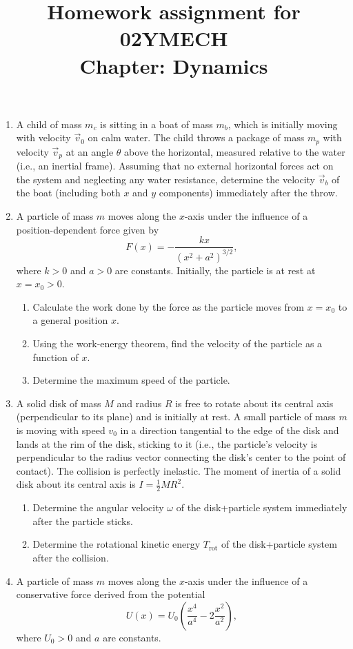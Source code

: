 \documentclass[12pt]{article}
\title{Homework assignment for 02YMECH \\ Chapter: Dynamics}
\begin{document}
\date{}
\maketitle
\vspace{-0.8in}
\begin{enumerate}
    \item A child of mass $m_c$ is sitting in a boat of mass $m_b$, which is initially moving with velocity $\vec{v}_0$ on calm water. The child throws a package of mass $m_p$ with velocity $\vec{v}_p$ at an angle $\theta$ above the horizontal, measured relative to the water (i.e., an inertial frame). Assuming that no external horizontal forces act on the system and neglecting any water resistance, determine the velocity $\vec{v}_b$ of the boat (including both $x$ and $y$ components) immediately after the throw.
    \item A particle of mass $m$ moves along the $x$-axis under the influence of a position-dependent force given by
\[
F(x) = - \frac{k x}{(x^2 + a^2)^{3/2}},
\]
where $k>0$ and $a>0$ are constants. Initially, the particle is at rest at $x = x_0 > 0$. 

\begin{enumerate}
    \item Calculate the work done by the force as the particle moves from $x = x_0$ to a general position $x$. 
    \item Using the work-energy theorem, find the velocity of the particle as a function of $x$. 
    \item Determine the maximum speed of the particle. 
\end{enumerate}
    \item A solid disk of mass $M$ and radius $R$ is free to rotate about its central axis (perpendicular to its plane) and is initially at rest. A small particle of mass $m$ is moving with speed $v_0$ in a direction tangential to the edge of the disk and lands at the rim of the disk, sticking to it (i.e., the particle’s velocity is perpendicular to the radius vector connecting the disk’s center to the point of contact). The collision is perfectly inelastic. The moment of inertia of a solid disk about its central axis is $I = \frac{1}{2} M R^2$.
    \begin{enumerate}
        \item Determine the angular velocity $\omega$ of the disk+particle system immediately after the particle sticks.
        \item Determine the rotational kinetic energy $T_\text{rot}$ of the disk+particle system after the collision.
    \end{enumerate}
    \item A particle of mass $m$ moves along the $x$-axis under the influence of a conservative force derived from the potential
\[
U(x) = U_0 \left( \frac{x^4}{a^4} - 2 \frac{x^2}{a^2} \right),
\]
where $U_0 > 0$ and $a$ are constants.


\end{enumerate}
\end{document}
